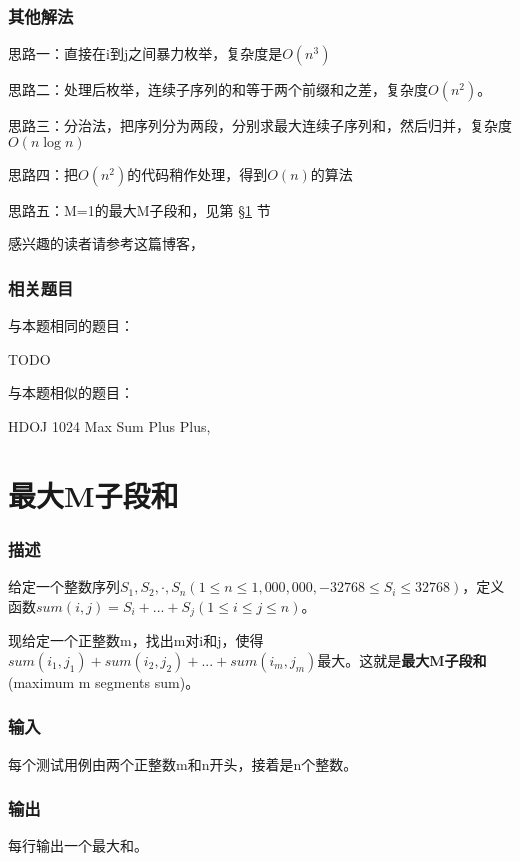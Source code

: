 \subsubsection{其他解法}

\begindot
\item 思路一：直接在i到j之间暴力枚举，复杂度是$O(n^3)$
\item 思路二：处理后枚举，连续子序列的和等于两个前缀和之差，复杂度$O(n^2)$。
\item 思路三：分治法，把序列分为两段，分别求最大连续子序列和，然后归并，复杂度$O(n\log n)$
\item 思路四：把$O(n^2)$的代码稍作处理，得到$O(n)$的算法
\item 思路五：M=1的最大M子段和，见第 \S \ref{sec:mmss} 节
\myenddot

感兴趣的读者请参考这篇博客，

\subsubsection{相关题目}
与本题相同的题目：
\begindot
\item TODO
\myenddot

与本题相似的题目：
\begindot
\item HDOJ 1024 Max Sum Plus Plus, 
\myenddot


\section{最大M子段和} %
\label{sec:mmss}

\subsubsection{描述}
给定一个整数序列$S_1,S_2,\cdot,S_n(1 \leq n \leq 1,000,000, -32768 \leq S_i \leq 32768)$，定义函数$sum(i,j)=S_i+ ... +S_j(1 \leq i \leq j \leq n)$。

现给定一个正整数m，找出m对i和j，使得$sum(i_1,j_1)+sum(i_2,j_2)+ ... +sum(i_m,j_m)$最大。这就是\textbf{最大M子段和}(maximum m segments sum)。

\subsubsection{输入}
每个测试用例由两个正整数m和n开头，接着是n个整数。

\subsubsection{输出}
每行输出一个最大和。

